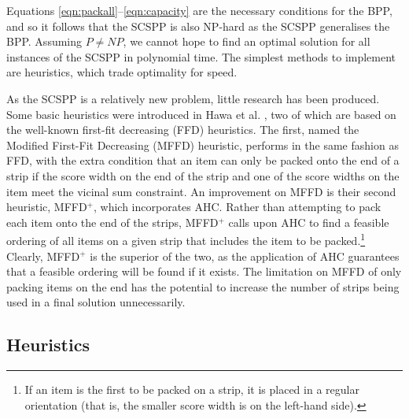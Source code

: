 \documentclass{elsarticle}
\begin{document}
Equations \eqref{eqn:packall}--\eqref{eqn:capacity} are the necessary conditions for the BPP, and so it follows that the SCSPP is also NP-hard as the SCSPP generalises the BPP. Assuming $P \neq NP$, we cannot hope to find an optimal solution for all instances of the SCSPP in polynomial time. The simplest methods to implement are heuristics, which trade optimality for speed.

As the SCSPP is a relatively new problem, little research has been produced. Some basic heuristics were introduced in Hawa et al. \cite{hawa2018}, two of which are based on the well-known first-fit decreasing (FFD) heuristics. The first, named the Modified First-Fit Decreasing (MFFD) heuristic, performs in the same fashion as FFD, with the extra condition that an item can only be packed onto the end of a strip if the score width on the end of the strip and one of the score widths on the item meet the vicinal sum constraint. An improvement on MFFD is their second heuristic, MFFD$^+$, which incorporates AHC. Rather than attempting to pack each item onto the end of the strips, MFFD$^+$ calls upon AHC to find a feasible ordering of all items on a given strip that includes the item to be packed.\footnote{If an item is the first to be packed on a strip, it is placed in a regular orientation (that is, the smaller score width is on the left-hand side).} Clearly, MFFD$^+$ is the superior of the two, as the application of AHC guarantees that a feasible ordering will be found if it exists. The limitation on MFFD of only packing items on the end has the potential to increase the number of strips being used in a final solution unnecessarily.

\subsection{Heuristics}
\label{sub:heuristics}
\end{document}
